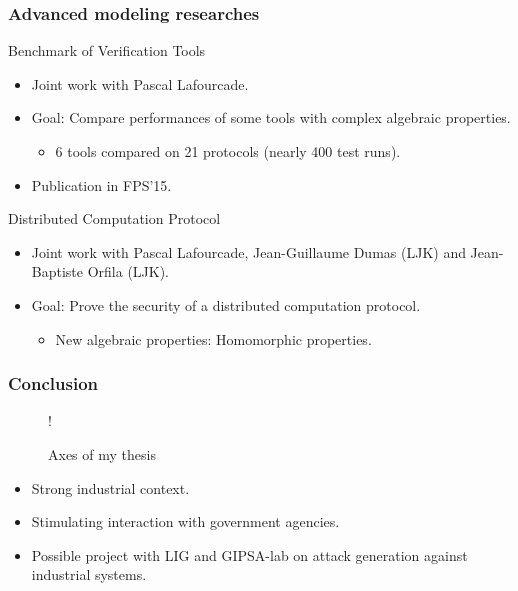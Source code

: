 \documentclass{beamer}
\begin{document}
\begin{frame}
    \frametitle{Advanced modeling researches}

    \begin{block}{Benchmark of Verification Tools}
        \begin{itemize}
            \item Joint work with Pascal Lafourcade.
            \item Goal: Compare performances of some tools with complex algebraic properties.
            \begin{itemize}
                \item 6 tools compared on 21 protocols (nearly 400 test runs).
            \end{itemize}
            \item Publication in FPS'15.
        \end{itemize}
    \end{block}
    \vfill
    \begin{block}{Distributed Computation Protocol}
        \begin{itemize}
            \item Joint work with Pascal Lafourcade, Jean-Guillaume Dumas (LJK) and Jean-Baptiste Orfila (LJK).
            \item Goal: Prove the security of a distributed computation protocol.
            \begin{itemize}
                \item New algebraic properties: Homomorphic properties.
            \end{itemize}
        \end{itemize}
    \end{block}
\end{frame}

\begin{frame}
    \frametitle{Conclusion}

    \begin{figure}[htb]
        \centering
         {!} {
            
        }
        \caption{Axes of my thesis}
    \end{figure}
    \vspace{-1em}
    \begin{itemize}
        \item Strong industrial context.
        \item Stimulating interaction with government agencies.
        \item Possible project with LIG and GIPSA-lab on attack generation against industrial systems.
    \end{itemize}
\end{frame}
\end{document}
